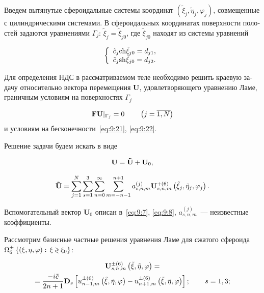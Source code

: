 \begin{russian}
Введем вытянутые сфероидальные системы координат $\left( {{{\tilde \xi }_j},{{\tilde \eta }_j},{\varphi _j}} \right)$, совмещенные с цилиндрическими системами. В сфероидальных координатах поверхности полостей задаются уравнениями ${\Gamma _j}:\,{\tilde \xi _j} = {\tilde \xi _{j0}}$, где $\tilde\xi_{j0}$ находят из системы уравнений

\begin{equation}
\left\{ {\begin{array}{*{20}{l}}
{{{\tilde c}_j}{\mathop{\rm ch}\nolimits} {{\tilde \xi }_{j0}} = {d_{j1}},}\\
{{{\tilde c}_j}{\mathop{\rm sh}\nolimits} {{\tilde \xi }_{j0}} = {d_{j2}}.}
\end{array}} \right.
\end{equation}

Для определения НДС в рассматриваемом теле необходимо решить краевую задачу относительно вектора перемещения $\mathbf{U}$, удовлетворяющего уравнению Ламе, граничным условиям на поверхностях $\Gamma_j$

\begin{equation}
{\bf{FU}}{|_{{\Gamma _j}}} = 0\qquad {\kern 1pt} \left( {j = \overline {1,N} } \right)
\label{eq:10:3}
\end{equation}
и условиям на бесконечности~\eqref{eq:9:21}, \eqref{eq:9:22}.

Решение задачи будем искать в виде

\begin{equation}
{\bf{U}} = {\bf{\tilde U}} + {{\bf{U}}_0},
\end{equation}

\begin{equation}
{\bf{\tilde U}} = \sum\limits_{j = 1}^N {\sum\limits_{s = 1}^3 {\sum\limits_{n = 0}^\infty  {\sum\limits_{m =  - n - 1}^{n + 1} {a_{s,n,m}^{(j)}} } } } {\bf{U}}_{s,n,m}^{ + (6)}\left( {{{\tilde \xi }_j},{{\tilde \eta }_j},{\varphi _j}} \right).
\end{equation}

Вспомогательный вектор $\mathbf{U}_0$ описан в~\eqref{eq:9:7}, \eqref{eq:9:8}, $a_{s,n,m}^{(j)}$~--- неизвестные коэффициенты.

Рассмотрим базисные частные решения уравнения Ламе для сжатого сфероида $\Omega _6^ \pm \left\{ {(\xi ,\eta ,\varphi ):{\mkern 1mu} {\kern 1pt} \xi  \mathbin{\lower.3ex\hbox{$\buildrel>\over
{\smash{\scriptstyle<}\vphantom{_x}}$}} {\xi _0}} \right\}$:

\begin{multline}
{\bf{U}}_{s,n,m}^{ \pm (6)}\left( {\tilde \xi ,\tilde \eta ,\varphi } \right) = \\
= \frac{{ - i\tilde c}}{{2n + 1}}{{\bf{D}}_s}\left[ {u_{n - 1,m}^{ \pm (6)}\left( {\tilde \xi ,\tilde \eta ,\varphi } \right) - u_{n + 1,m}^{ \pm (6)}\left( {\tilde \xi ,\tilde \eta ,\varphi } \right)} \right];\qquad {\kern 1pt} s = 1,3;
\label{eq:10:1}
\end{multline}


\end{russian}
